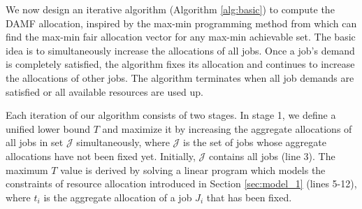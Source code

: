             


We now design an iterative algorithm (Algorithm \ref{alg:basic}) to compute the DAMF allocation, inspired by the max-min programming method from \cite{radunovic2007unified} which can find the max-min fair allocation vector for any max-min achievable set. The basic idea is to simultaneously increase the allocations of all jobs. Once a job's demand is completely satisfied, the algorithm fixes its allocation and continues to increase the allocations of other jobs. The algorithm terminates when all job demands are satisfied or all available resources are used up.

Each iteration of our algorithm consists of two stages. In stage 1, we define a unified lower bound $T$ and maximize it by increasing the aggregate allocations of all jobs in set $\mathcal{J}$ simultaneously, where $\mathcal{J}$ is the set of jobs whose aggregate allocations have not been fixed yet. Initially, $\mathcal{J}$ contains all jobs (line 3). The maximum $T$ value is derived by solving a linear program which models the constraints of resource allocation introduced in Section \ref{sec:model_1} (lines 5-12), where $t_i$ is the aggregate allocation of a job $J_i$ that has been fixed. 

